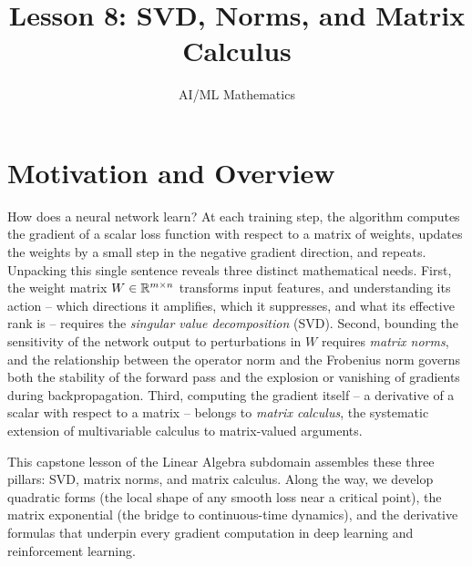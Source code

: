 \documentclass[11pt,a4paper]{article}
\title{Lesson 8: SVD, Norms, and Matrix Calculus}
\author{AI/ML Mathematics}
\date{}
\begin{document}
\maketitle
\tableofcontents
\newpage

\section{Motivation and Overview}
\label{sec:motivation}

How does a neural network learn?  At each training step, the algorithm
computes the gradient of a scalar loss function with respect to a
matrix of weights, updates the weights by a small step in the negative
gradient direction, and repeats.  Unpacking this single sentence
reveals three distinct mathematical needs.  First, the weight matrix
$W \in \mathbb{R}^{m \times n}$ transforms input features, and understanding
its action -- which directions it amplifies, which it suppresses, and
what its effective rank is -- requires the \emph{singular value
decomposition} (SVD).  Second, bounding the sensitivity of the network
output to perturbations in $W$ requires \emph{matrix norms}, and the
relationship between the operator norm and the Frobenius norm governs
both the stability of the forward pass and the explosion or vanishing
of gradients during backpropagation.  Third, computing the gradient
itself -- a derivative of a scalar with respect to a matrix -- belongs
to \emph{matrix calculus}, the systematic extension of multivariable
calculus to matrix-valued arguments.

This capstone lesson of the Linear Algebra subdomain assembles
these three pillars: SVD, matrix norms, and matrix calculus.  Along
the way, we develop quadratic forms (the local shape of any smooth loss
near a critical point), the matrix exponential (the bridge to
continuous-time dynamics), and the derivative formulas that underpin
every gradient computation in deep learning and reinforcement learning.
\end{document}
